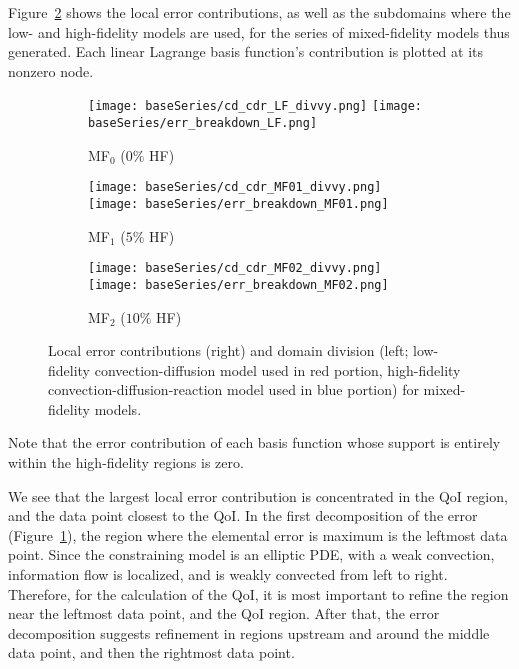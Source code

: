 Figure~\ref{fig:baseRef} shows the local error contributions, as well as the subdomains where the low- and high-fidelity models are used, for the series of mixed-fidelity models thus generated. Each linear Lagrange basis function's contribution is plotted at its nonzero node.
%
\begin{figure}[h]
\captionsetup[subfigure]{justification=centering,aboveskip=-10pt}
\centering
  \begin{subfigure}[b]{\textwidth}
  \centering    
    \texttt{[image: baseSeries/cd\_cdr\_LF\_divvy.png]}
    \texttt{[image: baseSeries/err\_breakdown\_LF.png]}
    \vspace{-0.5\baselineskip}
    \caption{MF$_0$ ($0\%$ HF)}
    \label{fig:baseRef0}
    \vspace{0.8\baselineskip}
  \end{subfigure}
	\begin{subfigure}[b]{\textwidth}
  \centering
    \texttt{[image: baseSeries/cd\_cdr\_MF01\_divvy.png]}
    \texttt{[image: baseSeries/err\_breakdown\_MF01.png]}
    \vspace{-0.5\baselineskip}
    \caption{MF$_1$ ($5\%$ HF)}
    \vspace{0.8\baselineskip}
  \end{subfigure}
  \begin{subfigure}[b]{\textwidth}
  \centering
    \texttt{[image: baseSeries/cd\_cdr\_MF02\_divvy.png]}
    \texttt{[image: baseSeries/err\_breakdown\_MF02.png]}
    \vspace{-0.5\baselineskip}
    \caption{MF$_2$ ($10\%$ HF)}
    \vspace{0.8\baselineskip}
  \end{subfigure}
\caption{Local error contributions (right) and domain division (left; low-fidelity convection-diffusion model used in red portion, high-fidelity convection-diffusion-reaction model used in blue portion) for mixed-fidelity models.}
\label{fig:baseRef}
\end{figure}
%
Note that the error contribution of each basis function whose support is entirely within the high-fidelity regions is zero.

We see that the largest local error contribution is concentrated in the QoI region, and the data point closest to the QoI. In the first decomposition of the error (Figure~\ref{fig:baseRef0}), the region where the elemental error is maximum is the leftmost data point. Since the constraining model is an elliptic PDE, with a weak convection, information flow is localized, and is weakly convected from left to right. Therefore, for the calculation of the QoI, it is most important to refine the region near the leftmost data point, and the QoI region. After that, the error decomposition suggests refinement in regions upstream and around the middle data point, and then the rightmost data point.

